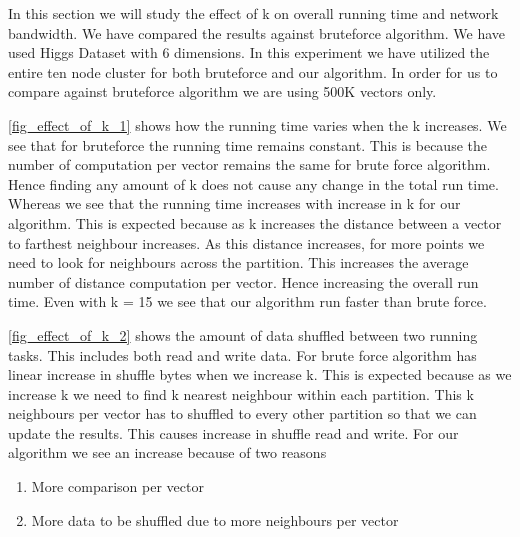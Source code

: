 In this section we will study the effect of k on overall running
time and network bandwidth. We have compared the results against bruteforce algorithm.
We have used Higgs Dataset with 6 dimensions. In this experiment we
have utilized the entire ten node cluster for both bruteforce and our
algorithm. In order for us to compare against bruteforce algorithm we are using
500K vectors only.

\cref{fig_effect_of_k_1} shows how
the running time varies when the k increases. We see that for
bruteforce the running time remains constant. This is because the
number of computation per vector remains the same for brute force
algorithm. Hence finding any amount of k does not
cause any change in the total run time. Whereas we see that the
running time increases with increase in k for our algorithm. This is
expected because as k increases the distance between a vector to
farthest neighbour increases. As this distance increases, for more
points we need to look for neighbours across the partition. This
increases the average number of distance computation per vector. Hence
increasing the overall run time. Even with k = 15 we see that our
algorithm run faster than brute force.

\cref{fig_effect_of_k_2} shows the amount of data
shuffled between two running tasks. This includes both read and
write data. For brute force algorithm has
linear increase in shuffle bytes when we increase k. This is expected
because as we increase k we need to find k nearest neighbour within
each partition. This k neighbours per vector has to shuffled to every
other partition so that we can update the results. This causes
increase in shuffle read and write. For our algorithm we see an
increase because of two reasons
\begin{enumerate}
\item More comparison per vector
\item More data to be shuffled due to more neighbours per vector
\end{enumerate}

